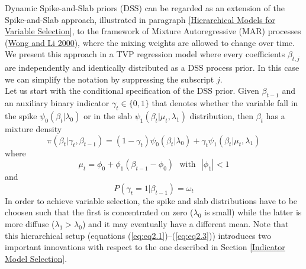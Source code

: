 \documentclass[
  12pt,
]{book}
\theoremstyle{break}
\theoremstyle{nonumberplain}
\begin{document}
Dynamic Spike-and-Slab priors (DSS) can be regarded as an extension of
the Spike-and-Slab approach, illustrated in paragraph
\ref{Hierarchical Models for Variable Selection}, to the framework of
Mixture Autoregressive (MAR) processes
(\protect\hyperlink{ref-WL_2000}{Wong and Li 2000}), where the mixing
weights are allowed to change over time. We present this approach in a
TVP regression model where every coefficients \(\beta_{t,j}\) are
independently and identically distributed as a DSS process prior. In
this case we can simplify the notation by suppressing the subscript
\(j\).\\
Let us start with the conditional specification of the DSS prior. Given
\(\beta_{t-1}\) and an auxiliary binary indicator
\(\gamma_{t} \in \{0,1\}\) that denotes whether the variable fall in the
spike \(\psi_{0}(\beta_{t}|\lambda_{0})\) or in the slab
\(\psi_{1}(\beta_{t}|\mu_{t},\lambda_{1})\) distribution, then
\(\beta_{t}\) has a mixture density \begin{equation} \label{eq:eq2.1}
\pi(\beta_{t}|\gamma_{t},\beta_{t-1})=(1-\gamma_{t})\psi_{0}(\beta_{t}|\lambda_{0})+\gamma_{t}\psi_{1}(\beta_{t}|\mu_{t},\lambda_{1})
\end{equation} where \begin{equation}\label{eq:eq2.2}
\mu_{t}=\phi_{0}+\phi_{1}(\beta_{t-1}-\phi_{0}) \ \ \ \text{with} \ \ \ |\phi_{1}|<1
\end{equation} and \begin{equation}\label{eq:eq2.3}
P(\gamma_{t}=1|\beta_{t-1})=\omega_{t}
\end{equation} In order to achieve variable selection, the spike and
slab distributions have to be choosen such that the first is
concentrated on zero (\(\lambda_0\) is small) while the latter is more
diffuse (\(\lambda_1 >\lambda_0\)) and it may eventually have a
different mean. Note that this hierarchical setup (equations
(\ref{eq:eq2.1})--(\ref{eq:eq2.3})) introduces two important innovations
with respect to the one described in Section
\ref{Indicator Model Selection}.
\end{document}
